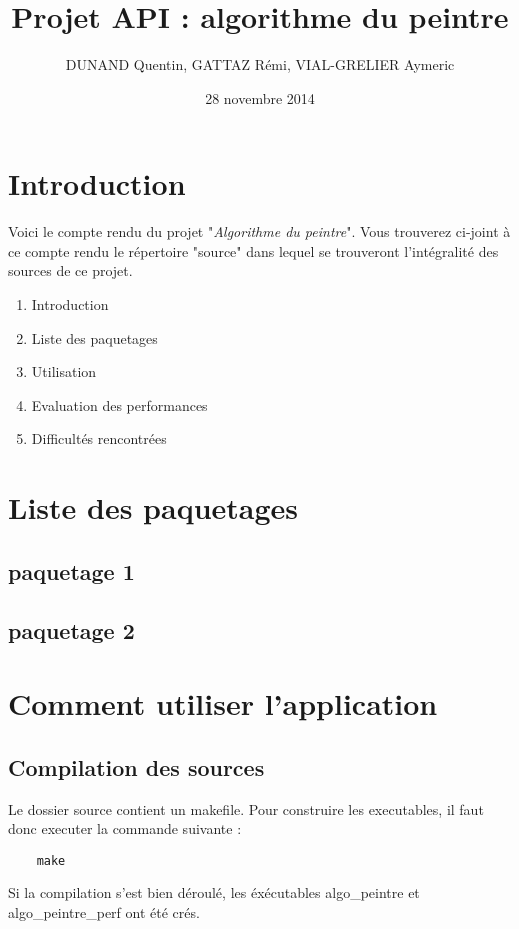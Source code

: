 \documentclass[a4paper]{article}
\title{Projet API : algorithme du peintre}
\author{DUNAND Quentin, GATTAZ Rémi, VIAL-GRELIER Aymeric}
\date{28 novembre 2014}
\begin{document}
\maketitle

\section{Introduction}

Voici le compte rendu du projet "\textit{Algorithme du peintre}".
Vous trouverez ci-joint à ce compte rendu le répertoire "source" dans lequel se trouveront l'intégralité des sources de ce projet.
\begin{enumerate}
\item Introduction
\item Liste des paquetages
\item Utilisation
\item Evaluation des performances
\item Difficultés rencontrées
\end{enumerate}


\section{Liste des paquetages}
\label{sec:examples}

\subsection{paquetage 1}


\subsection{paquetage 2}


\section{Comment utiliser l'application}
\subsection{Compilation des sources}
Le dossier source contient un makefile. Pour construire les executables, il faut donc executer la commande suivante :
\begin{lstlisting}
	make
\end{lstlisting}
Si la compilation s'est bien déroulé, les éxécutables algo\_peintre et algo\_peintre\_perf ont été crés.
\end{document}
